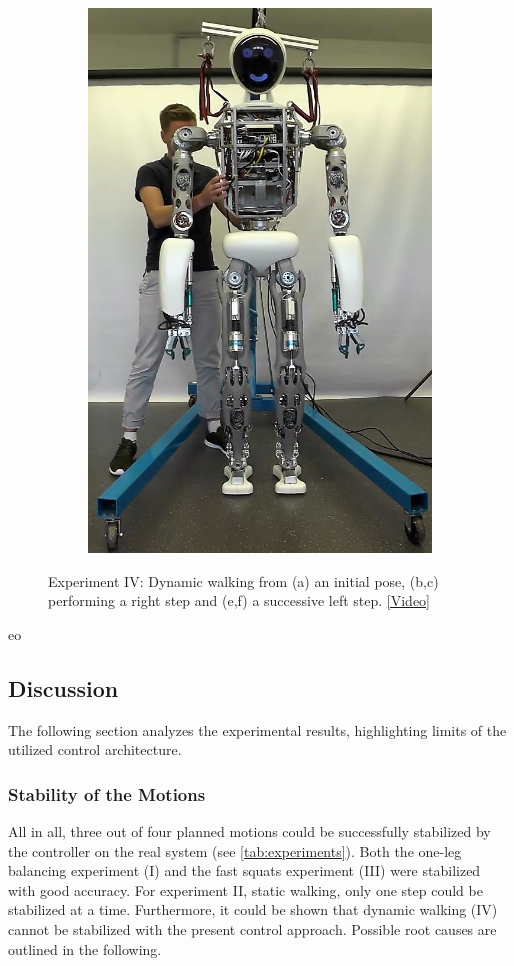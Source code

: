 \begin{figure}
\begin{subfigure}{.2\textwidth}
	\includegraphics[width=.95\linewidth]{experiments/walkDynamic/snaps/5}
	\caption{}
	\end{subfigure}%
\caption[Experiment IV: Dynamic walking]{Experiment IV: Dynamic walking from (a) an initial pose, (b,c) performing a right step and (e,f) a successive left step. \href{https://github.com/julesser/ma-thesis-experimental-results/blob/master/walkDynamic/walkDynamicFail.mp4}{[Video]}}
\label{exp:dynamicWalkingSnaps}
\end{figure} 
eo
\subsection{Discussion}
The following section analyzes the experimental results, highlighting limits of the utilized control architecture.
\subsubsection{Stability of the Motions}
All in all, three out of four planned motions could be successfully stabilized by the  controller on the real system (see \cref{tab:experiments}). Both the one-leg balancing experiment (I) and the fast squats experiment (III) were stabilized with good accuracy. For experiment II, static walking, only one step could be stabilized at a time. Furthermore, it could be shown that dynamic walking (IV) cannot be stabilized with the present control approach. Possible root causes are outlined in the following. 
